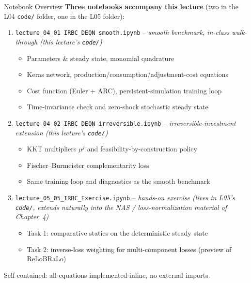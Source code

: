 \documentclass[aspectratio=169,11pt]{beamer}
\begin{document}
\begin{frame}{Notebook Overview}
\textbf{Three notebooks accompany this lecture} (two in the L04 \texttt{code/} folder, one in the L05 folder):

\vspace{0.5em}
\begin{enumerate}
    \item \texttt{lecture\_04\_01\_IRBC\_DEQN\_smooth.ipynb} -- \emph{smooth benchmark, in-class walk-through (this lecture's \texttt{code/})}
    \begin{itemize}\itemsep1pt\vspace{2pt}
        \item Parameters \& steady state, monomial quadrature
        \item Keras network, production/consumption/adjustment-cost equations
        \item Cost function (Euler + ARC), persistent-simulation training loop
        \item Time-invariance check and zero-shock stochastic steady state
    \end{itemize}

    \vspace{0.3em}
    \item \texttt{lecture\_04\_02\_IRBC\_DEQN\_irreversible.ipynb} -- \emph{irreversible-investment extension (this lecture's \texttt{code/})}
    \begin{itemize}\itemsep1pt\vspace{2pt}
        \item KKT multipliers $\mu^j$ and feasibility-by-construction policy
        \item Fischer--Burmeister complementarity loss
        \item Same training loop and diagnostics as the smooth benchmark
    \end{itemize}

    \vspace{0.3em}
    \item \texttt{lecture\_05\_05\_IRBC\_Exercise.ipynb} -- \emph{hands-on exercise (lives in L05's \texttt{code/}, extends naturally into the NAS / loss-normalization material of Chapter~4)}
    \begin{itemize}\itemsep1pt\vspace{2pt}
        \item Task 1: comparative statics on the deterministic steady state
        \item Task 2: inverse-loss weighting for multi-component losses (preview of ReLoBRaLo)
    \end{itemize}
\end{enumerate}

\vspace{0.4em}
{\small Self-contained: all equations implemented inline, no external imports.}
\end{frame}
\end{document}

